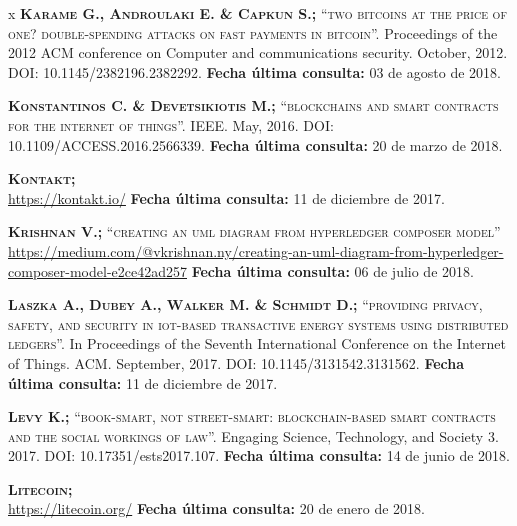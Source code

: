\begin{thebibliography} {x}
	 \textsc{\textbf{Karame G., Androulaki E. \& Capkun S.; }}\textsc{“two bitcoins at the price of one? double-spending attacks on fast payments in bitcoin”.} Proceedings of the 2012 ACM conference on Computer and communications security. October, 2012. DOI: 10.1145/2382196.2382292. 
	\newline \textbf{Fecha última consulta:} 03 de agosto de 2018.
	
	 \textsc{\textbf{Konstantinos C. \& Devetsikiotis M.; }}\textsc{“blockchains and smart contracts for the internet of things”.} IEEE. May, 2016. DOI: 10.1109/ACCESS.2016.2566339.
	\newline \textbf{Fecha última consulta:} 20 de marzo de 2018.
	
	 \textsc{\textbf{Kontakt; }} \\
	\url{https://kontakt.io/}
	\newline \textbf{Fecha última consulta:} 11 de diciembre de 2017.
	
	 \textsc{\textbf{Krishnan V.; }}\textsc{“creating an uml diagram from hyperledger composer model”} \\
	\url{https://medium.com/@vkrishnan.ny/creating-an-uml-diagram-from-hyperledger-composer-model-e2ce42ad257}
	\newline \textbf{Fecha última consulta:} 06 de julio de 2018.
		
	 \textsc{\textbf{Laszka A., Dubey A., Walker M. \& Schmidt D.; }} \textsc{“providing privacy, safety, and security in iot-based transactive energy systems using distributed ledgers”.} In Proceedings of the Seventh International Conference on the Internet of Things. ACM. September, 2017. DOI: 10.1145/3131542.3131562.	
	\newline \textbf{Fecha última consulta:} 11 de diciembre de 2017.
	
	 \textsc{\textbf{Levy K.; }}\textsc{“book-smart, not street-smart: blockchain-based smart contracts and the social workings of law”.} Engaging Science, Technology, and Society 3. 2017. DOI: 10.17351/ests2017.107.
	\newline \textbf{Fecha última consulta:} 14 de junio de 2018.
	
	 \textsc{\textbf{Litecoin; }} \\
	\url{https://litecoin.org/}
	\newline \textbf{Fecha última consulta:} 20 de enero de 2018.
		

\end{thebibliography}
